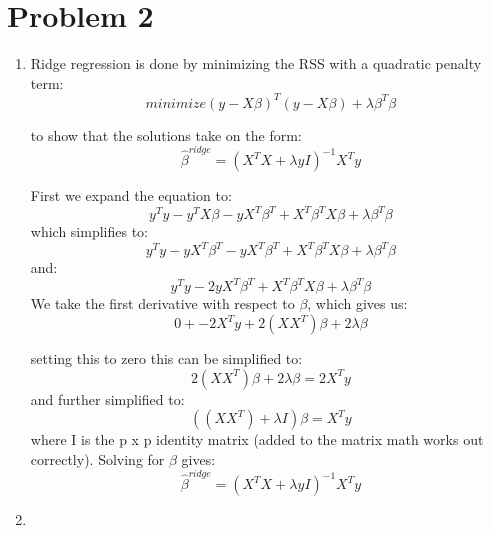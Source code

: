 \section*{Problem 2}
\begin{enumerate}
\item 
Ridge regression is done by minimizing the RSS with a quadratic penalty term:
\[ minimize (y -X\beta)^T(y-X\beta) + \lambda\beta^T\beta  \]

\noindent to show that the solutions take on the form:
\[ \hat{\beta}^{ridge} = (X^TX + \lambda yI)^{-1}X^Ty \]

\noindent First we expand the equation to:
\[ y^Ty - y^TX\beta - yX^T\beta^T + X^T\beta^TX\beta + \lambda\beta^T\beta \]
\noindent which simplifies to:
\[ y^Ty - yX^T\beta^T - yX^T\beta^T + X^T\beta^TX\beta + \lambda\beta^T\beta \]
\noindent and:
\[ y^Ty - 2yX^T\beta^T + X^T\beta^TX\beta + \lambda\beta^T\beta \]
\noindent We take the first derivative with respect to $\beta$, which gives us:
\[ 0 + - 2X^Ty + 2(XX^T)\beta  + 2\lambda\beta\] 

\noindent setting this to zero this can be simplified to: 
\[ 2(XX^T)\beta + 2\lambda\beta = 2X^Ty \]
\noindent and further simplified to: 
\[ ((XX^T)+ \lambda I)\beta = X^Ty \]
\noindent where I is the p x p identity matrix (added to the matrix math works out correctly). Solving for $\beta$ gives:
\[ \hat{\beta}^{ridge} = (X^TX + \lambda yI)^{-1}X^Ty \]
\item
\end{enumerate}






